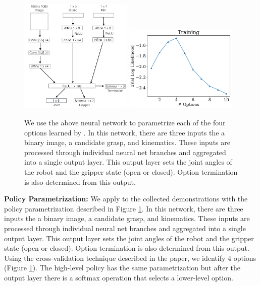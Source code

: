 \begin{figure} [ht!]
    \includegraphics[width=0.48\textwidth]{ddco-experiments/net.png}
    \includegraphics[width=0.48\textwidth]{ddco-experiments/exp6-1.png}
    \caption{We use the above neural network to parametrize each of the four options learned by \alg. In this network, there are three inputs the a binary image, a candidate grasp, and kinematics. These inputs are processed through individual neural net branches and aggregated into a single output layer. This output layer sets the joint angles of the robot and the gripper state (open or closed). Option termination is also determined from this output. \label{fig:dvrknet}}
\end{figure}

\vspace{0.25em} \noindent \textbf{Policy Parametrization: } We apply \alg to the collected demonstrations with the policy parametrization described in Figure \ref{fig:dvrknet}. In this network, there are three inputs the a binary image, a candidate grasp, and kinematics. These inputs are processed through individual neural net branches and aggregated into a single output layer. This output layer sets the joint angles of the robot and the gripper state (open or closed). Option termination is also determined from this output. Using the cross-validation technique described in the paper, we identify 4 options (Figure \ref{fig:dvrknet}). The high-level policy has the same parametrization but after the output layer there is a softmax operation that selects a lower-level option.  

